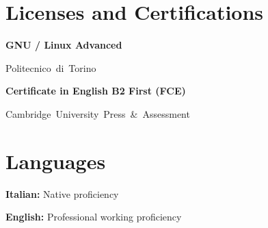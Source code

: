 
\begin{sidebysections}
    \section{Licenses and Certifications}
    
    \begin{onecolentry}
        \textbf{GNU / Linux Advanced}

        \vspace{0.10 cm}
        
        \mbox{Politecnico di Torino}
    \end{onecolentry}
    
    \vspace{0.2 cm}
    
    \begin{onecolentry}
        \textbf{Certificate in English B2 First (FCE)}
        
        \vspace{0.10 cm}
        
        \mbox{Cambridge University Press \& Assessment}
    \end{onecolentry}
    
    \switchsection

    \vspace{0.05cm}
    
    \section{Languages}
    
    \begin{onecolentry}
        \textbf{Italian:} Native proficiency
    \end{onecolentry}
    
    \vspace{0.2 cm}
    
    \begin{onecolentry}
        \textbf{English:} Professional working proficiency
    \end{onecolentry}
\end{sidebysections}
